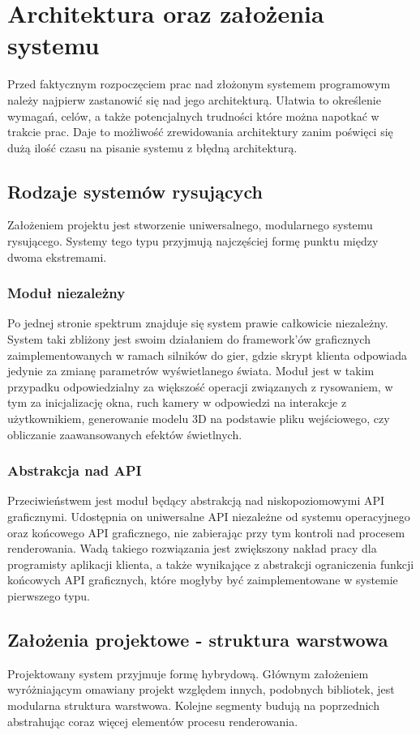 \chapter{Architektura oraz założenia systemu}
Przed faktycznym rozpoczęciem prac nad złożonym systemem programowym należy najpierw zastanowić się nad jego architekturą.
Ułatwia to określenie wymagań, celów, a także potencjalnych trudności które można napotkać w trakcie prac. 
Daje to możliwość zrewidowania architektury zanim poświęci się dużą ilość czasu na pisanie systemu z błędną architekturą.

\section{Rodzaje systemów rysujących}
Założeniem projektu jest stworzenie uniwersalnego, modularnego systemu rysującego.
Systemy tego typu przyjmują najczęściej formę punktu między dwoma ekstremami. 

\subsection{Moduł niezależny}
Po jednej stronie spektrum znajduje się system prawie całkowicie niezależny. System taki zbliżony jest swoim działaniem do framework'ów graficznych zaimplementowanych w ramach silników do gier, gdzie skrypt klienta odpowiada jedynie za zmianę parametrów wyświetlanego świata. 
Moduł jest w takim przypadku odpowiedzialny za większość operacji związanych z rysowaniem, w tym za inicjalizację okna, ruch kamery w odpowiedzi na interakcje z użytkownikiem, generowanie modelu 3D na podstawie pliku wejściowego, czy obliczanie zaawansowanych efektów świetlnych.

\subsection{Abstrakcja nad API}
Przeciwieństwem jest moduł będący abstrakcją nad niskopoziomowymi API graficznymi. Udostępnia on uniwersalne API niezależne od systemu operacyjnego oraz końcowego API graficznego, nie zabierając przy tym kontroli nad procesem renderowania.
Wadą takiego rozwiązania jest zwiększony nakład pracy dla programisty aplikacji klienta, a także wynikające z abstrakcji ograniczenia funkcji końcowych API graficznych, które mogłyby być zaimplementowane w systemie pierwszego typu.

\section{Założenia projektowe - struktura warstwowa}
Projektowany system przyjmuje formę hybrydową.
Głównym założeniem wyróżniającym omawiany projekt względem innych, podobnych bibliotek, jest modularna struktura warstwowa.
Kolejne segmenty budują na poprzednich abstrahując coraz więcej elementów procesu renderowania.

